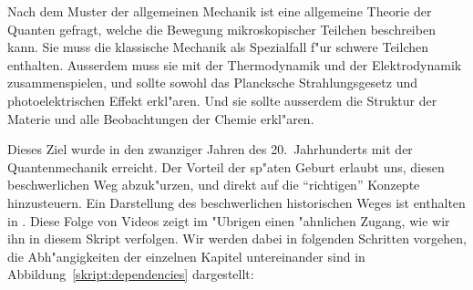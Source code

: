 Nach dem Muster der allgemeinen Mechanik ist eine allgemeine
Theorie der Quanten gefragt, welche die Bewegung mikroskopischer Teilchen
beschreiben kann. Sie muss die klassische Mechanik als Spezialfall
f"ur schwere Teilchen enthalten. Ausserdem muss sie mit der
Thermodynamik und der Elektrodynamik zusammenspielen, und sollte
sowohl das Plancksche Strahlungsgesetz und photoelektrischen
Effekt erkl"aren.
Und sie sollte ausserdem die Struktur der Materie und alle Beobachtungen
der Chemie erkl"aren.

Dieses Ziel wurde in den zwanziger Jahren des 20.~Jahrhunderts mit 
der Quantenmechanik erreicht.
Der Vorteil der sp"aten Geburt erlaubt uns, diesen beschwerlichen Weg
abzuk"urzen, und direkt auf die ``richtigen'' Konzepte hinzusteuern.
Ein Darstellung des beschwerlichen historischen Weges ist enthalten
in \cite{skript:viascience}.
Diese Folge von Videos zeigt im "Ubrigen einen "ahnlichen Zugang,
wie wir ihn in diesem Skript verfolgen.
Wir werden dabei in folgenden Schritten vorgehen,
die Abh"angigkeiten der einzelnen Kapitel untereinander sind in
Abbildung~\ref{skript:dependencies} dargestellt:
